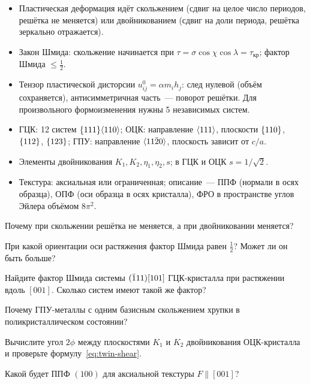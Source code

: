 \begin{itogi}
\begin{itemize}
\item Пластическая деформация идёт скольжением (сдвиг на целое число
периодов, решётка не меняется) или двойникованием (сдвиг на доли периода,
решётка зеркально отражается).
\item Закон Шмида: скольжение начинается при
$\tau=\sigma\cos\chi\cos\lambda=\tau_\text{кр}$; фактор Шмида $\le\frac12$.
\item Тензор пластической дисторсии $u^0_{ij}=\alpha m_ih_j$: след нулевой
(объём сохраняется), антисимметричная часть~— поворот решётки. Для
произвольного формоизменения нужны 5 независимых систем.
\item ГЦК: 12 систем $\{111\}\langle 110\rangle$; ОЦК: направление $\langle 111\rangle$,
плоскости $\{110\}$, $\{112\}$, $\{123\}$; ГПУ: направление
$\langle 11\bar{2}0\rangle$, плоскость зависит от $c/a$.
\item Элементы двойникования $K_1,K_2,\eta_1,\eta_2,s$; в ГЦК и ОЦК
$s=1/\sqrt2$.
\item Текстура: аксиальная или ограниченная; описание~— ППФ (нормали в
осях образца), ОПФ (оси образца в осях кристалла), ФРО в пространстве
углов Эйлера объёмом $8\pi^2$.
\end{itemize}
\end{itogi}

\begin{proverka}
\item Почему при скольжении решётка не меняется, а при двойниковании
меняется?
\item При какой ориентации оси растяжения фактор Шмида равен
$\frac12$? Может ли он быть больше?
\item Найдите фактор Шмида системы $(\bar{1}11)[101]$ ГЦК-кристалла при
растяжении вдоль $[001]$. Сколько систем имеют такой же фактор?
\item Почему ГПУ-металлы с одним базисным скольжением хрупки в
поликристаллическом состоянии?
\item Вычислите угол $2\phi$ между плоскостями $K_1$ и $K_2$ двойникования
ОЦК-кристалла и проверьте формулу~\eqref{eq:twin-shear}.
\item Какой будет ППФ $(100)$ для аксиальной текстуры $F\parallel[001]$?
\end{proverka}
